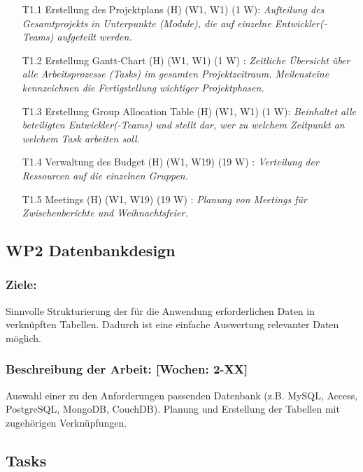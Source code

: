 \documentclass{report}
\begin{document}
\begin{enumerate}
\item [T1.1] Erstellung des Projektplans (H) (W1, W1) (1 W): \emph{ Aufteilung des Gesamtprojekts in Unterpunkte (Module), die auf einzelne Entwickler(-Teams) aufgeteilt werden.}
\item [T1.2] Erstellung Gantt-Chart (H) (W1, W1) (1 W) : \emph{ Zeitliche Übersicht über alle Arbeitsprozesse (Tasks) im gesamten Projektzeitraum. Meilensteine kennzeichnen die Fertigstellung wichtiger Projektphasen.}
\item [T1.3] Erstellung Group Allocation Table (H) (W1, W1) (1 W): \emph{ Beinhaltet alle beteiligten Entwickler(-Teams) und stellt dar, wer zu welchem Zeitpunkt an welchem Task arbeiten soll.}
\item [T1.4] Verwaltung des Budget (H) (W1, W19) (19 W) : \emph{Verteilung der Ressourcen auf die einzelnen Gruppen.}
\item [T1.5] Meetings (H) (W1, W19) (19 W) : \emph{Planung von Meetings für Zwischenberichte und Weihnachtsfeier.}
\end{enumerate}

\subsection*{WP2 Datenbankdesign}

\subsubsection{Ziele:} Sinnvolle Strukturierung der für die Anwendung erforderlichen Daten in verknüpften Tabellen. Dadurch ist eine einfache Auswertung relevanter Daten möglich.
\subsubsection{Beschreibung der Arbeit: [Wochen: 2-XX]} Auswahl einer zu den Anforderungen passenden Datenbank (z.B. MySQL, Access, PostgreSQL, MongoDB, CouchDB). Planung und Erstellung der Tabellen mit zugehörigen Verknüpfungen.


\subsection*{Tasks}
\end{document}
